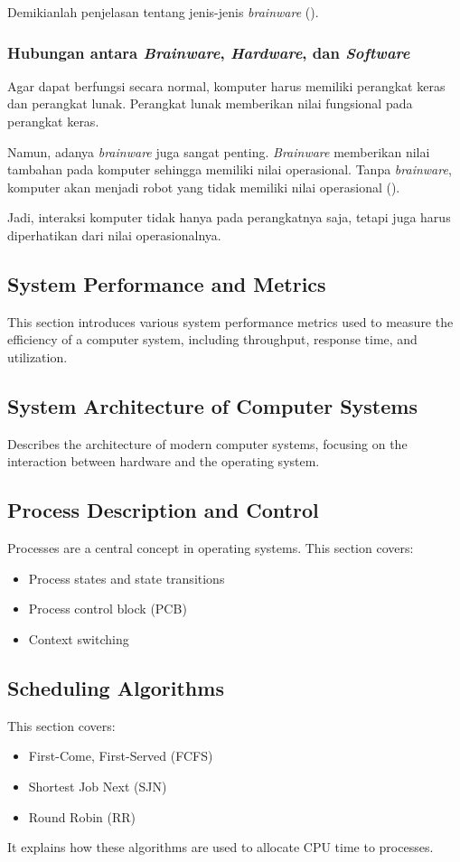 \documentclass[12pt]{article}
\begin{document}
Demikianlah penjelasan tentang jenis-jenis \textit{brainware} (\cite{brainwarecmlabs}).

\subsubsection*{Hubungan antara \textit{Brainware}, \textit{Hardware}, dan \textit{Software}}
\hspace{0.5cm} Agar dapat berfungsi secara normal, komputer harus memiliki perangkat keras dan perangkat lunak. Perangkat lunak memberikan nilai fungsional pada perangkat keras.

Namun, adanya \textit{brainware} juga sangat penting. \textit{Brainware} memberikan nilai tambahan pada komputer sehingga memiliki nilai operasional. Tanpa \textit{brainware}, komputer akan menjadi robot yang tidak memiliki nilai operasional (\cite{interaksi3ware}).

Jadi, interaksi komputer tidak hanya pada perangkatnya saja, tetapi juga harus diperhatikan dari nilai operasionalnya.

\subsection{System Performance and Metrics}
This section introduces various system performance metrics used to measure the efficiency of a computer system, including throughput, response time, and utilization.

\subsection{System Architecture of Computer Systems}
Describes the architecture of modern computer systems, focusing on the interaction between hardware and the operating system.

\subsection{Process Description and Control}
Processes are a central concept in operating systems. This section covers:
\begin{itemize}
    \item Process states and state transitions
    \item Process control block (PCB)
    \item Context switching
\end{itemize}

\subsection{Scheduling Algorithms}
This section covers:
\begin{itemize}
    \item First-Come, First-Served (FCFS)
    \item Shortest Job Next (SJN)
    \item Round Robin (RR)
\end{itemize}
It explains how these algorithms are used to allocate CPU time to processes.
\end{document}
